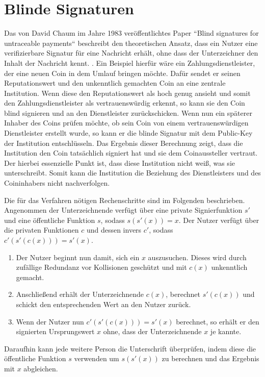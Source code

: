 \documentclass{scrreprt}
\begin{document}
\section{Blinde Signaturen}
\label{sec:blindSig}
Das von David Chaum im Jahre 1983 veröffentlichtes Paper ``Blind signatures for untraceable payments`` beschreibt den theoretischen Ansatz, dass ein Nutzer eine verifizierbare Signatur für eine Nachricht erhält, ohne dass der Unterzeichner den Inhalt der Nachricht kennt. \cite{chaum1983blind}. Ein Beispiel hierfür wäre ein Zahlungsdienstleister, der eine neuen Coin in dem Umlauf bringen möchte. Dafür sendet er seinen Reputationswert und den unkenntlich gemachten Coin an eine zentrale Institution. Wenn diese den Reputationswert als hoch genug ansieht und somit den Zahlungsdienstleister als vertrauenswürdig erkennt, so kann sie den Coin blind signieren und an den Dienstleister zurückschicken. Wenn nun ein späterer Inhaber des Coins prüfen möchte, ob sein Coin von einem vertrauenswürdigen Dienstleister erstellt wurde, so kann er die blinde Signatur mit dem Public-Key der Institution entschlüsseln. Das Ergebnis dieser Berechnung zeigt, dass die Institution den Coin tatsächlich signiert hat und sie dem Coinaussteller vertraut. Der hierbei essenzielle Punkt ist, dass diese Institution nicht weiß, was sie unterschreibt. Somit kann die Institution die Beziehung des Dienstleisters und des Coininhabers nicht nachverfolgen. 

Die für das Verfahren nötigen Rechenschritte sind im Folgenden beschrieben. Angenommen der Unterzeichnende verfügt über eine private Signierfunktion $s'$ und eine öffentliche Funktion $s$, sodass $s(s'(x)) = x$. Der Nutzer verfügt über die privaten Funktionen $c$ und dessen invers $c'$, sodass $c'(s'(c(x))) = s'(x)$. 
\begin{enumerate}
    \item Der Nutzer beginnt nun damit, sich ein $x$ auszusuchen. Dieses wird durch zufällige Redundanz vor Kollisionen geschützt und mit $c(x)$ unkenntlich gemacht.
    \item Anschließend erhält der Unterzeichnende $c(x)$, berechnet $s'(c(x))$ und schickt den entsprechenden Wert an den Nutzer zurück.
    \item Wenn der Nutzer nun $c'(s'(c(x))) = s'(x)$ berechnet, so erhält er den signierten Ursprungswert $x$ ohne, dass der Unterzeichnende $x$ je kannte.
\end{enumerate}
Daraufhin kann jede weitere Person die Unterschrift überprüfen, indem diese die öffentliche Funktion $s$ verwenden um $s(s'(x))$ zu berechnen und das Ergebnis mit $x$ abgleichen. 
\end{document}
